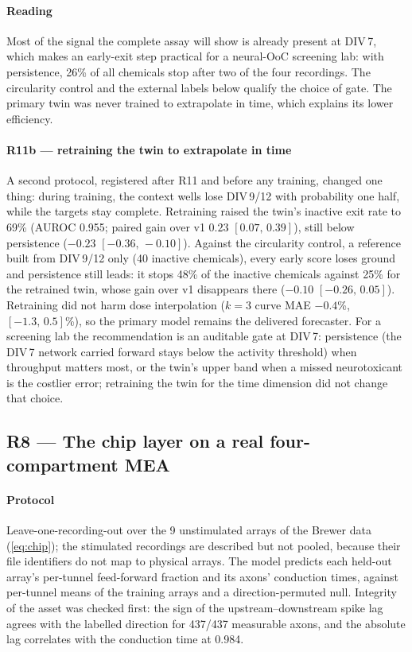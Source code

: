 \documentclass[11pt,a4paper]{article}
\newcommand{\ci}[2]{\ensuremath{[#1,\,#2]}}          %
\newcommand{\sgn}[1]{\ensuremath{#1}}                  %
\newcommand{\brNoStim}{9}
\begin{document}
\paragraph{Reading}
Most of the signal the complete assay will show is already present at DIV\,7, which makes an early-exit step
practical for a neural-OoC screening lab: with persistence,
26\% of all chemicals stop after two of
the four recordings. The circularity control and the external labels below qualify the choice of gate. The
primary twin was never trained to extrapolate in time, which explains its lower efficiency.

\paragraph{R11b --- retraining the twin to extrapolate in time}
A second protocol, registered after R11 and before any training, changed one thing: during training, the
context wells lose DIV\,9/12 with probability one half, while the targets stay complete. Retraining raised the
twin's inactive exit rate to 69\%
(AUROC 0.955; paired gain over v1
\sgn{ 0.23 }
\ci{ 0.07 }{ 0.39 }),
still below persistence
(\sgn{ -0.23 }
\ci{ -0.36 }{ -0.10 }).
Against the circularity control, a reference built from DIV\,9/12 only
(40 inactive chemicals), every early score
loses ground and persistence still leads: it stops
48\% of
the inactive chemicals against
25\% for the
retrained twin, whose gain over v1 disappears there
(\sgn{ -0.10 }
\ci{ -0.26 }{ 0.05 }).
Retraining did not harm dose interpolation (\(k=3\) curve MAE
\sgn{ -0.4 }\%,
\ci{ -1.3 }{ 0.5 }\%),
so the primary model remains the delivered forecaster. For a screening lab the recommendation is an auditable
gate at DIV\,7: persistence (the DIV\,7 network carried forward stays below the activity threshold) when throughput
matters most, or the twin's upper band when a missed neurotoxicant is the costlier error; retraining the twin for
the time dimension did not change that choice.

\subsection{R8 --- The chip layer on a real four-compartment MEA}\label{sec:r8}

\paragraph{Protocol}
Leave-one-recording-out over the \brNoStim{} unstimulated arrays of the Brewer data
(\cref{eq:chip}); the stimulated recordings are described but not pooled, because their file identifiers do not
map to physical arrays. The model predicts each held-out array's per-tunnel feed-forward fraction and its axons'
conduction times, against per-tunnel means of the training arrays and a direction-permuted null. Integrity of the
asset was checked first: the sign of the upstream--downstream spike lag agrees with the labelled direction for
437/437 measurable axons, and the absolute lag correlates with the
conduction time at 0.984.
\end{document}
